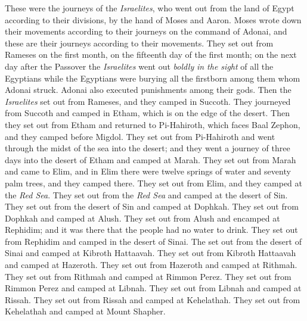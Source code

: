\begin{biblechapter} %
 These were the journeys of the \textit{Israelites}, who went out from the land of Egypt according to their divisions, by the hand of Moses and Aaron.
\verse Moses wrote down their movements according to their journeys on the command of Adonai, and these are their journeys according to their movements.
\verse They set out from Rameses on the first month, on the fifteenth day of the first month; on the next day after the Passover the \textit{Israelites} went out \textit{boldly} \textit{in the sight} of all the Egyptians
\verse while the Egyptians were burying all the firstborn among them whom Adonai struck. Adonai also executed punishments among their gods.
\verse Then the \textit{Israelites} set out from Rameses, and they camped in Succoth.
\verse They journeyed from Succoth and camped in Etham, which is on the edge of the desert.
\verse Then they set out from Etham and returned to Pi-Hahiroth, which faces Baal Zephon, and they camped before Migdol.
\verse They set out from Pi-Hahiroth and went through the midst of the sea into the desert; and they went a journey of three days into the desert of Etham and camped at Marah.
\verse They set out from Marah and came to Elim, and in Elim there were twelve springs of water and seventy palm trees, and they camped there.
\verse They set out from Elim, and they camped at the \textit{Red Sea}.
\verse They set out from the \textit{Red Sea} and camped at the desert of Sin.
\verse They set out from the desert of Sin and camped at Dophkah.
\verse They set out from Dophkah and camped at Alush.
\verse They set out from Alush and encamped at Rephidim; and it was there that the people had no water to drink.
\verse They set out from Rephidim and camped in the desert of Sinai.
\verse The set out from the desert of Sinai and camped at Kibroth Hattaavah.
\verse They set out from Kibroth Hattaavah and camped at Hazeroth.
\verse They set out from Hazeroth and camped at Rithmah.
\verse They set out from Rithmah and camped at Rimmon Perez.
\verse They set out from Rimmon Perez and camped at Libnah.
\verse They set out from Libnah and camped at Rissah.
\verse They set out from Rissah and camped at Kehelathah.
\verse They set out from Kehelathah and camped at Mount Shapher.

\end{biblechapter}

